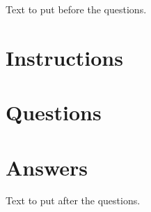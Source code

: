 \documentclass[11pt]{article}
\begin{document}
Text to put before the questions.


\section{Instructions}

\section{Questions}

\section{Answers}


Text to put after the questions.
\end{document}
